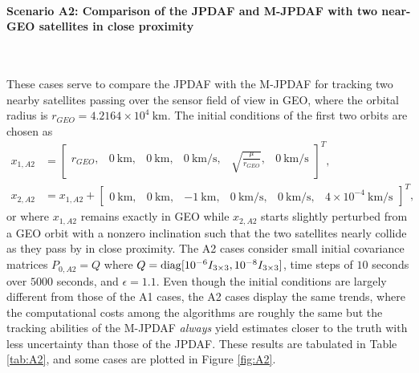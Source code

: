 \paragraph*{Scenario A2: Comparison of the JPDAF and M-JPDAF with two near-GEO satellites in close proximity}\ 

These cases serve to compare the JPDAF with the M-JPDAF for tracking two nearby satellites passing over the sensor field of view in GEO, where the orbital radius is $r_{GEO}=4.2164\times10^{4}\ \text{km}$. The initial conditions of the first two orbits are chosen as
\begin{align*}
x_{1,A2}&=\begin{bmatrix}r_{GEO}, & 0\ \text{km}, & 0\ \text{km}, & 0\ \text{km/s}, & \sqrt{\frac{\mu}{r_{GEO}}}, & 0\ \text{km/s}\end{bmatrix}^T,
\\
x_{2,A2}&=x_{1,A2}+\begin{bmatrix}
0\ \text{km}, & 0\ \text{km}, & -1\ \text{km}, & 0\ \text{km/s}, & 0\ \text{km/s}, & 4\times10^{-4}\ \text{km/s}
\end{bmatrix}^T,
\end{align*}
or where $x_{1,A2}$ remains exactly in GEO while $x_{2,A2}$ starts slightly perturbed from a GEO orbit with a nonzero inclination such that the two satellites nearly collide as they pass by in close proximity.
The A2 cases consider small initial covariance matrices $P_{0,A2}= Q$ where $Q=\mathop{\mathrm{diag}}\nolimits[10^{-6}I_{3\times3}, 10^{-8}I_{3\times3}]$, time steps of $10$ seconds over $5000$ seconds, and $\epsilon=1.1$.
Even though the initial conditions are largely different from those of the A1 cases, the A2 cases display the same trends, where the computational costs among the algorithms are roughly the same but the tracking abilities of the M-JPDAF \emph{always} yield estimates closer to the truth with less uncertainty than those of the JPDAF.
These results are tabulated in Table \ref{tab:A2}, and some cases are plotted in Figure \ref{fig:A2}.

